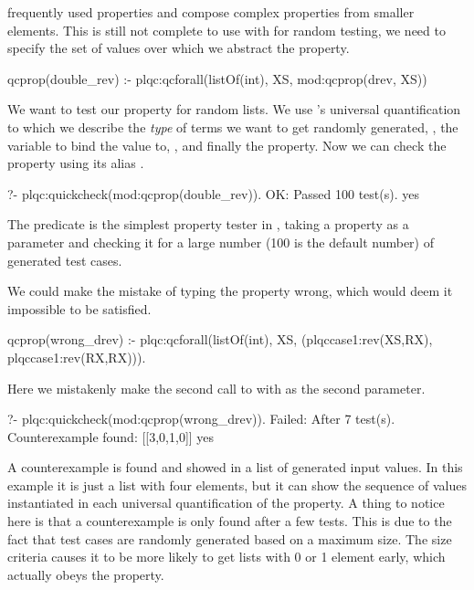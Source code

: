 frequently used properties and compose complex properties from smaller
elements.
%
This is still not complete to use with \plqc{} for random testing, we
need to specify the set of values over which we abstract the property.
%
\begin{yapcode}
 qcprop(double_rev) :-
   plqc:qcforall(listOf(int), XS,
                 mod:qcprop({drev, XS}))
\end{yapcode}
%
We want to test our  property for random  lists.
%
We use \plqc{}'s universal quantification to which we describe the
\emph{type} of terms we want to get randomly generated,
, the variable to bind the value to, ,
and finally the property.
%
Now we can check the property using its alias .
\begin{yapcode}
   ?- plqc:quickcheck(mod:qcprop(double_rev)).
 OK: Passed 100 test(s).
 yes
\end{yapcode}
%
The  predicate is the simplest property tester in
\plqc{}, taking a property as a parameter and checking it for a large
number (100 is the default number) of generated test cases.


We could make the mistake of typing the property wrong, which would deem
it impossible to be satisfied.
%
\begin{yapcode}
 qcprop(wrong_drev) :-
   plqc:qcforall(listOf(int), XS,
                 (plqccase1:rev(XS,RX),
                  plqccase1:rev(RX,RX))).
\end{yapcode}
%
Here we mistakenly make the second call to  with  as
the second parameter.
%
\begin{yapcode}
   ?- plqc:quickcheck(mod:qcprop(wrong_drev)).
 Failed: After 7 test(s).
 Counterexample found: [[3,0,1,0]] 
 yes
\end{yapcode}
A counterexample is found and showed in a list of generated input
values.
%
In this example it is just a list with four elements, but it can show
the sequence of values instantiated in each universal quantification of
the property.
%
A thing to notice here is that a counterexample is only found after a
few tests.
%
This is due to the fact that test cases are randomly generated based on
a maximum size.
%
The size criteria causes it to be more likely to get lists with 0 or 1
element early, which actually obeys the property.


